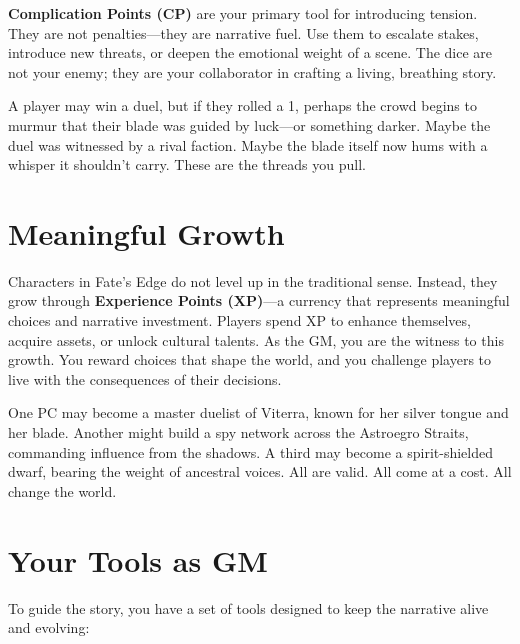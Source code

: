 \textbf{Complication Points (CP)} are your primary tool for introducing tension. They are not penalties---they are narrative fuel. Use them to escalate stakes, introduce new threats, or deepen the emotional weight of a scene. The dice are not your enemy; they are your collaborator in crafting a living, breathing story.

A player may win a duel, but if they rolled a 1, perhaps the crowd begins to murmur that their blade was guided by luck---or something darker. Maybe the duel was witnessed by a rival faction. Maybe the blade itself now hums with a whisper it shouldn't carry. These are the threads you pull.

\section*{Meaningful Growth}

Characters in Fate's Edge do not level up in the traditional sense. Instead, they grow through \textbf{Experience Points (XP)}---a currency that represents meaningful choices and narrative investment. Players spend XP to enhance themselves, acquire assets, or unlock cultural talents. As the GM, you are the witness to this growth. You reward choices that shape the world, and you challenge players to live with the consequences of their decisions.

One PC may become a master duelist of Viterra, known for her silver tongue and her blade. Another might build a spy network across the Astroegro Straits, commanding influence from the shadows. A third may become a spirit-shielded dwarf, bearing the weight of ancestral voices. All are valid. All come at a cost. All change the world.

\section*{Your Tools as GM}

To guide the story, you have a set of tools designed to keep the narrative alive and evolving:

